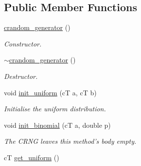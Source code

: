 \subsection*{Public Member Functions}
\begin{DoxyCompactItemize}
\item 
\hypertarget{classlgraph_1_1utils_1_1crandom__generator_a90bfc340dcb2fa15e744cff6e280978a}{\hyperlink{classlgraph_1_1utils_1_1crandom__generator_a90bfc340dcb2fa15e744cff6e280978a}{crandom\-\_\-generator} ()}\label{classlgraph_1_1utils_1_1crandom__generator_a90bfc340dcb2fa15e744cff6e280978a}

\begin{DoxyCompactList}\small\item\em Constructor. \end{DoxyCompactList}\item 
\hypertarget{classlgraph_1_1utils_1_1crandom__generator_ade03d6aba0a68ba5b34582cf8107b7aa}{\hyperlink{classlgraph_1_1utils_1_1crandom__generator_ade03d6aba0a68ba5b34582cf8107b7aa}{$\sim$crandom\-\_\-generator} ()}\label{classlgraph_1_1utils_1_1crandom__generator_ade03d6aba0a68ba5b34582cf8107b7aa}

\begin{DoxyCompactList}\small\item\em Destructor. \end{DoxyCompactList}\item 
void \hyperlink{classlgraph_1_1utils_1_1crandom__generator_addfa5951276296b2a164e5dc482728ce}{init\-\_\-uniform} (c\-T a, c\-T b)
\begin{DoxyCompactList}\small\item\em Initialise the uniform distribution. \end{DoxyCompactList}\item 
\hypertarget{classlgraph_1_1utils_1_1crandom__generator_a4d7042cb0862c3b8b4792890e6c5388c}{void \hyperlink{classlgraph_1_1utils_1_1crandom__generator_a4d7042cb0862c3b8b4792890e6c5388c}{init\-\_\-binomial} (c\-T a, double p)}\label{classlgraph_1_1utils_1_1crandom__generator_a4d7042cb0862c3b8b4792890e6c5388c}

\begin{DoxyCompactList}\small\item\em The C\-R\-N\-G leaves this method's body empty. \end{DoxyCompactList}\item 
\hypertarget{classlgraph_1_1utils_1_1crandom__generator_a39dd7f9d80fd5be685cc240719050119}{c\-T \hyperlink{classlgraph_1_1utils_1_1crandom__generator_a39dd7f9d80fd5be685cc240719050119}{get\-\_\-uniform} ()}\label{classlgraph_1_1utils_1_1crandom__generator_a39dd7f9d80fd5be685cc240719050119}


\end{DoxyCompactItemize}
